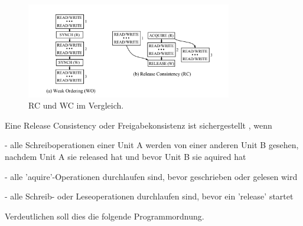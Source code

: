 \documentclass[final,bibliography=totocnumbered]{include/sikseminar}
\begin{document}
\begin{figure}[htbp] %
  \centering
  \includegraphics[width=0.8\textwidth]{figures/compare}
  \caption{RC und WC im Vergleich\cite{mcm3}.}
  \label{Fig:compare}
\end{figure}


Eine Release Consistency oder Freigabekonsistenz ist sichergestellt \cite{designingmcm}, wenn

- alle Schreiboperationen einer Unit A werden von einer anderen Unit B gesehen, nachdem Unit A sie released hat und bevor Unit B sie aquired hat

- alle 'aquire'-Operationen durchlaufen sind, bevor geschrieben oder gelesen wird

- alle Schreib- oder Leseoperationen durchlaufen sind, bevor ein 'release' startet

Verdeutlichen soll dies die folgende Programmordnung.
\end{document}
